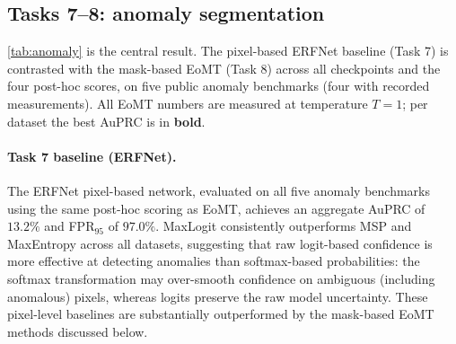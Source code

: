 \subsection{Tasks 7--8: anomaly segmentation}
\label{sec:res-anomaly}
\cref{tab:anomaly} is the central result. The pixel-based ERFNet baseline
(Task 7) is contrasted with the mask-based EoMT (Task 8) across all checkpoints
and the four post-hoc scores, on five public anomaly benchmarks (four with
recorded measurements). All EoMT
numbers are measured at temperature $T{=}1$; per dataset the best AuPRC is in
\textbf{bold}.

\paragraph{Task 7 baseline (ERFNet).}
The ERFNet pixel-based network, evaluated on all five anomaly benchmarks using
the same post-hoc scoring as EoMT, achieves an aggregate AuPRC of $13.2\%$ and
FPR$_{95}$ of $97.0\%$. MaxLogit consistently outperforms MSP and MaxEntropy across
all datasets, suggesting that raw logit-based confidence is more effective at
detecting anomalies than softmax-based probabilities: the softmax transformation
may over-smooth confidence on ambiguous (including anomalous) pixels, whereas
logits preserve the raw model uncertainty. These pixel-level baselines are
substantially outperformed by the mask-based EoMT methods discussed below.

